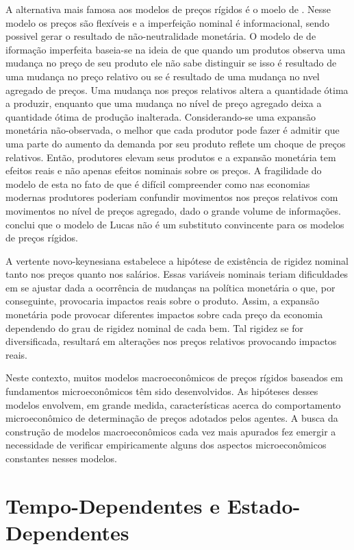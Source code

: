 \documentclass[twoside,a4paper,11pt]{report}
\begin{document}
A alternativa mais famosa aos modelos de preços rígidos é o moelo de \citet{lucas1972expectations}. Nesse modelo os preços são flexíveis e a imperfeição nominal é informacional, sendo possivel gerar o resultado de não-neutralidade monetária. O modelo de \citet{lucas1972expectations} de iformação imperfeita baseia-se na ideia de que quando um produtos observa uma mudança no preço de seu produto ele não sabe distinguir se isso é resultado de uma mudança no preço relativo ou se é resultado de uma mudança no nvel agregado de preços. Uma mudança nos preços relativos altera a quantidade ótima a produzir, enquanto que uma mudança no nível de preço agregado deixa a quantidade ótima de produção inalterada. Considerando-se uma expansão monetária não-observada, o melhor que cada produtor pode fazer é admitir que uma parte do aumento da demanda por seu produto reflete um choque de preços relativos. Então, produtores elevam seus produtos e a expansão monetária tem efeitos reais e não apenas efeitos nominais sobre os preços. A fragilidade do modelo de \citet{lucas1972expectations} esta no fato de que é difícil compreender como nas economias modernas produtores poderiam confundir movimentos nos preços relativos com movimentos no nível de preços agregado, dado o grande volume de informações. \citet{ball1994sticky} conclui que o modelo de Lucas não é um substituto convincente para os modelos de preços rígidos.

A vertente novo-keynesiana estabelece a hipótese de existência de rigidez nominal tanto nos preços quanto nos salários. Essas variáveis nominais teriam dificuldades em se ajustar dada a ocorrência de mudanças na política monetária o que, por conseguinte, provocaria impactos reais sobre o produto. Assim, a expansão monetária pode provocar diferentes impactos sobre cada preço da economia dependendo do grau de rigidez nominal de cada bem. Tal rigidez se for diversificada, resultará em alterações nos preços relativos provocando impactos reais.

Neste contexto, muitos modelos macroeconômicos de preços rígidos baseados em fundamentos microeconômicos têm sido desenvolvidos. As hipóteses desses modelos envolvem, em grande medida, características acerca do comportamento microeconômico de determinação de preços adotados pelos agentes. A busca da construção de modelos macroeconômicos cada vez mais apurados fez emergir a necessidade de verificar empiricamente alguns dos aspectos microeconômicos constantes nesses modelos. 

\section*{Tempo-Dependentes e Estado-Dependentes}
\end{document}
